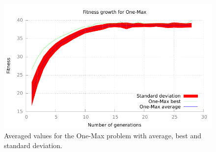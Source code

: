\begin{figure}[h!]
	\includegraphics{../graphs/fitness_target_one.pdf}
	\caption{Averaged values for the One-Max problem 
	with average, best and standard deviation.}
	\label{fig:target one max}
\end{figure}
